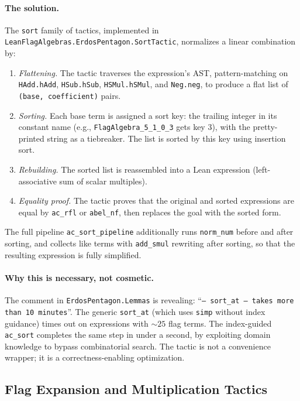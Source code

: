 \documentclass{article}
\newcommand{\lean}[1]{\texttt{#1}}
\begin{document}
\paragraph{The solution.}
The \lean{sort} family of tactics, implemented in
\lean{LeanFlagAlgebras.ErdosPentagon.SortTactic}, normalizes a linear
combination by:
\begin{enumerate}
  \item \emph{Flattening.}  The tactic traverses the expression's AST,
    pattern-matching on \lean{HAdd.hAdd}, \lean{HSub.hSub},
    \lean{HSMul.hSMul}, and \lean{Neg.neg}, to produce a flat list of
    \lean{(base, coefficient)} pairs.
  \item \emph{Sorting.}  Each base term is assigned a sort key: the trailing
    integer in its constant name (e.g., \lean{FlagAlgebra\_5\_1\_0\_3} gets
    key $3$), with the pretty-printed string as a tiebreaker.  The list is
    sorted by this key using insertion sort.
  \item \emph{Rebuilding.}  The sorted list is reassembled into a Lean
    expression (left-associative sum of scalar multiples).
  \item \emph{Equality proof.}  The tactic proves that the original and sorted
    expressions are equal by \lean{ac\_rfl} or \lean{abel\_nf}, then replaces
    the goal with the sorted form.
\end{enumerate}
The full pipeline \lean{ac\_sort\_pipeline} additionally runs \lean{norm\_num}
before and after sorting, and collects like terms with
\lean{add\_smul} rewriting after sorting, so that the resulting expression is
fully simplified.

\paragraph{Why this is necessary, not cosmetic.}
The comment in \lean{ErdosPentagon.Lemmas} is revealing:
``\texttt{-- sort\_at -- takes more than 10 minutes}''.
The generic \lean{sort\_at} (which uses \lean{simp} without index guidance)
times out on expressions with $\sim 25$ flag terms.  The index-guided
\lean{ac\_sort} completes the same step in under a second, by exploiting domain
knowledge to bypass combinatorial search.  The tactic is not a convenience
wrapper; it is a correctness-enabling optimization.

\subsection{Flag Expansion and Multiplication Tactics}
\end{document}
